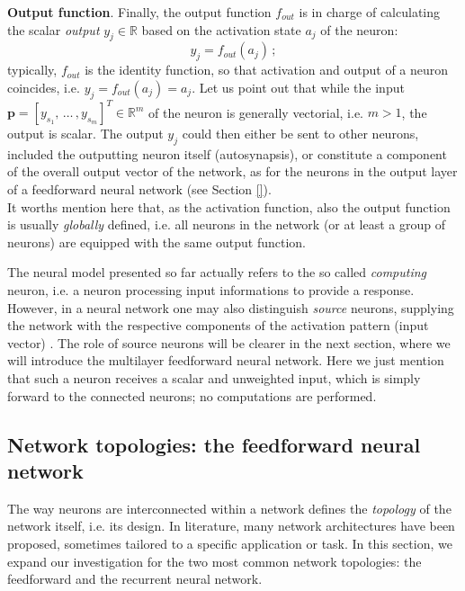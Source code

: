 \documentclass[11pt, a4paper]{report}
\theoremstyle{theorem}
\numberwithin{equation}{section}
\numberwithin{figure}{section}
\begin{document}
		\noindent \textbf{Output function}. Finally, the output function $f_{out}$ is in charge of calculating the scalar \emph{output} $y_j \in \mathbb{R}$ based on the activation state $a_j$ of the neuron:
		\begin{equation}
			\label{eq:output-function}
			y_j = f_{out}(a_j) \, ;
		\end{equation} 
		typically, $f_{out}$ is the identity function, so that activation and output of a neuron coincides, i.e. $y_j = f_{out}(a_j) = a_j$. Let us point out that while the input $\boldsymbol{p} = [y_{s_1}, \, \ldots \, , y_{s_m}]^T \in \mathbb{R}^m$ of the neuron is generally vectorial, i.e. $m > 1$, the output is scalar. The output $y_j$ could then either be sent to other neurons, included the outputting neuron itself (autosynapsis), or constitute a component of the overall output vector of the network, as for the neurons in the output layer of a feedforward neural network (see Section \ref{}). \\
		It worths mention here that, as the activation function, also the output function is usually \emph{globally} defined, i.e. all neurons in the network (or at least a group of neurons) are equipped with the same output function.
		
		\vspace*{0.3cm}
		
		The neural model presented so far actually refers to the so called \emph{computing} neuron, i.e. a neuron processing input informations to provide a response. However, in a neural network one may also distinguish \emph{source} neurons, supplying the network with the respective components of the activation pattern (input vector) \cite{Hay05}. The role of source neurons will be clearer in the next section, where we will introduce the multilayer feedforward neural network. Here we just mention that such a neuron receives a scalar and unweighted input, which is simply forward to the connected neurons; no computations are performed.
		
	\subsection{Network topologies: the feedforward neural network}
	\label{section:Network topologies}
		
		The way neurons are interconnected within a network defines the \emph{topology} of the network itself, i.e. its design. In literature, many network architectures have been proposed, sometimes tailored to a specific application or task. In this section, we expand our investigation for the two most common network topologies: the feedforward and the recurrent neural network.
		
\end{document}
